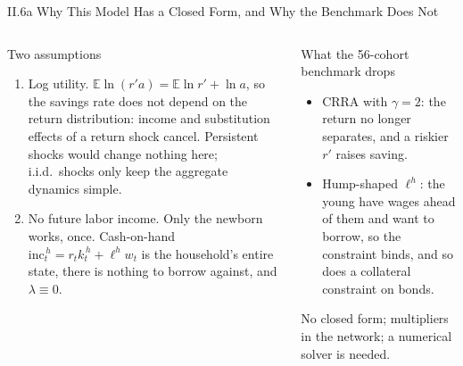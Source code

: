 \documentclass[aspectratio=169,11pt]{beamer}
\newcommand{\emphc}[1]{\textcolor{harvardcrimson}{#1}}
\begin{document}
\begin{frame}{II.6a Why This Model Has a Closed Form, and Why the Benchmark Does Not}
\footnotesize
\begin{columns}[T]
\begin{block}{Two assumptions}
\vspace{-2pt}\begin{enumerate}\itemsep3pt
    \item \emphc{Log utility.}  $\mathbb{E}\ln(r'a) = \mathbb{E}\ln r' + \ln a$, so the savings rate does
          not depend on the return distribution: income and substitution effects of a return shock
          cancel. Persistent shocks would change nothing here; i.i.d.\ shocks only keep the aggregate
          dynamics simple.
    \item \emphc{No future labor income.}  Only the newborn works, once. Cash-on-hand
          $\text{inc}_t^{\,h} = r_t k_t^{\,h} + \ell^h w_t$ is the household's entire state, there is nothing
          to borrow against, and $\lambda\equiv 0$.
\end{enumerate}
\end{block}

\begin{alertblock}{What the 56-cohort benchmark drops}
\vspace{-2pt}\begin{itemize}\itemsep2pt
    \item CRRA with $\gamma=2$: the return no longer separates, and a riskier $r'$ raises saving.
    \item Hump-shaped $\ell^h$: the young have wages ahead of them and want to borrow, so the
          constraint binds, and so does a collateral constraint on bonds.
\end{itemize}
\vspace{2pt}
No closed form; multipliers in the network; a numerical solver is needed.
\end{alertblock}
\end{columns}
\end{frame}
\end{document}
